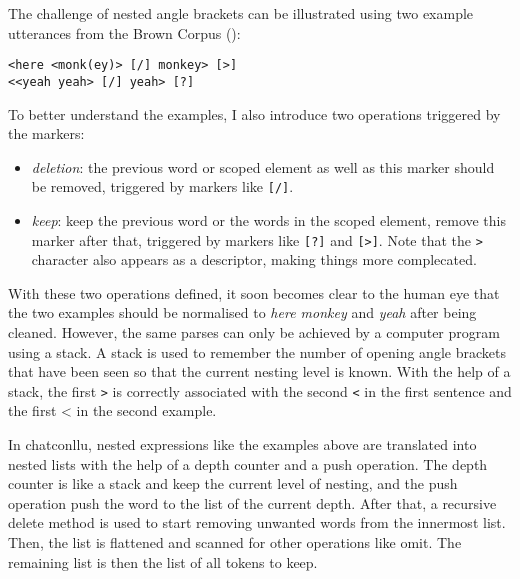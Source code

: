 The challenge of nested angle brackets can be illustrated using two example utterances from the Brown Corpus (\cite{brown1973}):

\texttt{<here <monk(ey)> [/] monkey> [>]}\\  %
\texttt{<<yeah yeah> [/] yeah> [?]} %

To better understand the examples, I also introduce two operations triggered by the markers:
\begin{itemize}
	\item \emph{deletion}: the previous word or scoped element as well as this marker should be removed, triggered by markers like \texttt{[/]}.
	\item \emph{keep}: keep the previous word or the words in the scoped element, remove this marker after that, triggered by markers like \texttt{[?]} and \texttt{[>]}. Note that the \texttt{>} character also appears as a descriptor, making things more complecated.
\end{itemize}

With these two operations defined, it soon becomes clear to the human eye that the two examples should be normalised to \emph{here monkey} and \emph{yeah} after being cleaned. However, the same parses can only be achieved by a computer program using a stack. A stack is used to remember the number of opening angle brackets that have been seen so that the current nesting level is known. With the help of a stack, the first \texttt{>} is correctly associated with the second \texttt{<} in the first sentence and the first {<} in the second example.

In chatconllu, nested expressions like the examples above are translated into nested lists with the help of a depth counter and a push operation. The depth counter is like a stack and keep the current level of nesting, and the push operation push the word to the list of the current depth. After that, a recursive delete method is used to start removing unwanted words from the innermost list. Then, the list is flattened and scanned for other operations like omit. The remaining list is then the list of all tokens to keep.

